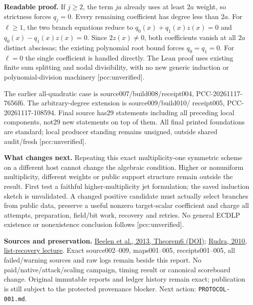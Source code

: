 \documentclass[10pt]{article}
\begin{document}
\textbf{Readable proof.} If $j\ge2$, the term $ja$ already uses at least
$2a$ weight, so strictness forces $q_j=0$. Every remaining coefficient has
degree less than $2a$. For $\ell\ge1$, the two branch equations reduce to
$q_0(x)+q_1(x)z(x)=0$ and $q_0(x)-q_1(x)z(x)=0$.
Since $2z(x)\ne0$, both coefficients vanish at all $2a$ distinct abscissas;
the existing polynomial root bound forces $q_0=q_1=0$. For $\ell=0$ the
single coefficient is handled directly. The Lean proof uses existing finite
sum splitting and nodal divisibility, with no new generic induction or
polynomial-division machinery [pcc:unverified].

The earlier all-quadratic case is source007/build008/receipt004,
PCC-20261117-7656f6. The arbitrary-degree extension is source009/build010/
receipt005, PCC-20261117-108594. Final source has29 statements including all
preceding local components, not29 new statements on top of them. All final
printed foundations are standard; local producer standing remains unsigned,
outside shared audit/fresh [pcc:unverified].

\textbf{What changes next.} Repeating this exact multiplicity-one symmetric
scheme on a different host cannot change the algebraic condition.
Higher or nonuniform multiplicity, different weights or public support
structure remain outside the result. First test a faithful higher-multiplicity
jet formulation; the saved induction sketch is unvalidated. A changed positive
candidate must actually select branches from public data, preserve a useful
nonzero target-scalar coefficient and charge all attempts, preparation,
field/bit work, recovery and retries. No general ECDLP existence or
nonexistence conclusion follows [pcc:unverified].

\textbf{Sources and preservation.}
\href{https://doi.org/10.1109/TIT.2013.2243800}{Beelen et al., 2013, Theorem6 (DOI)};
\href{https://cse.buffalo.edu/faculty/atri/courses/coding-theory/spr10/lectures/lect39.pdf}{Rudra, 2010, list-recovery lecture}.
Exact source002--009, maps001--005, receipts001--005, all failed/warning
sources and raw logs remain beside this report. No paid/native/attack/scaling
campaign, timing result or canonical scoreboard change. Original immutable
reports and ledger history remain exact; publication is still subject to the
protected provenance blocker. Next action: \texttt{PROTOCOL-001.md}.
\end{document}
